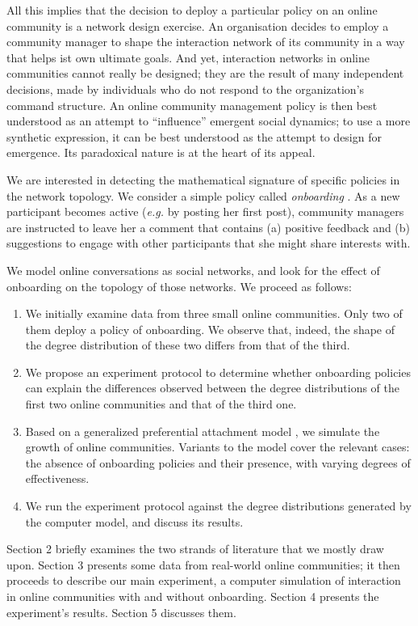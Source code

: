 \documentclass{article}
\begin{document}
All this implies that the decision to deploy a particular policy on an online community is a network design exercise. An organisation decides to employ a community manager to shape the interaction network of its community in a way that helps ist own ultimate goals. 
And yet, interaction networks in online communities cannot really be designed; they are the result of many independent decisions, made by individuals who do not respond to the organization's command structure. An online community management policy is then best understood as an attempt to ``influence'' emergent social dynamics; to use a more synthetic expression, it can be best understood as the attempt to design for emergence. Its paradoxical nature is at the heart of its appeal. 

We are interested in detecting the mathematical signature of specific policies in the network topology. 
We consider a simple policy called \emph{onboarding} \cite{rheingold1993virtual, shirky2008here}. As a new participant becomes active (\emph{e.g.} by posting her first post), community managers are instructed to leave her a comment that contains (a) positive feedback and (b) suggestions to engage with other participants that she might share interests with.

We model online conversations as social networks, and look for the effect of onboarding on the topology of those networks. We proceed as follows:
\begin{enumerate}
\item We initially examine data from three small online communities. Only two of them deploy a policy of onboarding. We observe that, indeed, the shape of the degree distribution of these two differs from that of the third.  
\item We propose an experiment protocol to determine whether onboarding policies can explain the differences observed between the degree distributions of the first two online communities and that of the third one. 
\item Based on a generalized preferential attachment model \cite{dorogovtsev2002evolution}, we simulate the growth of online communities. Variants to the model cover the relevant cases: the absence of onboarding policies and their presence, with varying degrees of effectiveness. 
\item We run the experiment protocol against the degree distributions generated by the computer model, and discuss its results.
\end{enumerate}
Section 2 briefly examines the two strands of literature that we mostly draw upon. Section 3 presents some data from real-world online communities; it then proceeds to describe our main experiment, a computer simulation of interaction in online communities with and without onboarding. Section 4 presents the experiment's results. Section 5 discusses them.
\end{document}
